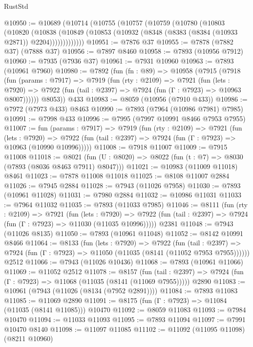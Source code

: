 \begin{lexlean}{RustStd}
\begin{coremodule}
{\begin{coremodule}
{{{{{{{{{{{{{{{{{{{{{{{{{{{{{{{{{{{{{{{{{{{{{{{{{{@10950 := @10689
    (@10714
      (@10755
        (@10757
          (@10759
            (@10780
              (@10803
                (@10820
                  (@10838
                    (@10849 (@10853 (@10932 (@8348 (@8383 (@8384 (@10933 @2871)) @2204)))))))))))))
@10951 := @7876 @37
@10955 := @7878 (@7882 @37) (@7888 @37)
@10956 := @7897 @8460
@10958 := @7893 (@10956 @7912)
@10960 := @7935 (@7936 @37)
@10961 := @7931 @10960
@10963 := @7893 (@10961 @7960)
@10980 := @7892
    (fun (fn : @89) =>
    @10958
      (@7915
        (@7918
          (fun (params : @7917) =>
          @7919
            (fun (rty : @2109) =>
            @7921
              (fun (lets : @7920) =>
              @7922 (fun (tail : @2397) => @7924 (fun (Γ : @7923) => @10963 @8007))))))
        @8053))
    @433
@10983 := @8059 (@10956 (@7910 @433))
@10986 := @7972 (@7973 @433) @8463
@10990 := @7893 (@7964 (@10986 @7981) @7985)
@10991 := @7998 @433
@10996 := @7995 (@7997 @10991 @8466 @7953 @7955)
@11007 := fun (params : @7917) =>
  @7919
    (fun (rty : @2109) =>
    @7921
      (fun (lets : @7920) =>
      @7922 (fun (tail : @2397) => @7924 (fun (Γ : @7923) => @10963 (@10990 @10996)))))
@11008 := @7918 @11007
@11009 := @7915 @11008
@11018 := @8021 (fun (U : @8020) => @8022 (fun (t : @7) => @8030 (@7893 (@8036 @8463 @7911) @8047)))
@11021 := @10983 (@11009 @11018) @8461
@11023 := @7878 @11008 @11018
@11025 := @8108 @11007 @2884
@11026 := @7945 @2884
@11028 := @7943 (@11026 @7958)
@11030 := @7893 (@10961 @11028)
@11031 := @7980 @2884
@11032 := @10986 @11031
@11033 := @7964 @11032
@11035 := @7893 (@11033 @7985)
@11046 := @8111
    (fun (rty : @2109) =>
    @7921
      (fun (lets : @7920) =>
      @7922 (fun (tail : @2397) => @7924 (fun (Γ : @7923) => @11030 (@11035 @10996)))))
    @2381
@11048 := @7943 (@11026 @8135)
@11050 := @7893 (@10961 @11048)
@11052 := @8142 @10991 @8466
@11064 := @8133
    (fun (lets : @7920) =>
    @7922
      (fun (tail : @2397) =>
      @7924 (fun (Γ : @7923) => @11050 (@11035 (@8141 (@11052 @7953 @7955))))))
    @2512
@11066 := @7943 (@11026 @10436)
@11068 := @7893 (@10961 @11066)
@11069 := @11052 @2512
@11078 := @8157
    (fun (tail : @2397) => @7924 (fun (Γ : @7923) => @11068 (@11035 (@8141 (@11069 @7955)))))
    @2890
@11083 := @10961 (@7943 (@11026 (@8134 (@7952 @2891))))
@11084 := @7893 @11083
@11085 := @11069 @2890
@11091 := @8175 (fun (Γ : @7923) => @11084 (@11035 (@8141 @11085))) @10470
@11092 := @8059 @11083
@11093 := @7984 @10470
@11094 := @11033 @11093
@11095 := @7893 @11094
@11097 := @7991 @10470 @8140
@11098 := @11097 @11085
@11102 := @11092 (@11095 @11098) (@8211 @10960)
}}}}}}}}}}}}}}}}}}}}}}}}}}}}}}}}}}}}}}}}}}}}}}}}}}
\end{coremodule}}
\end{coremodule}
\end{lexlean}
